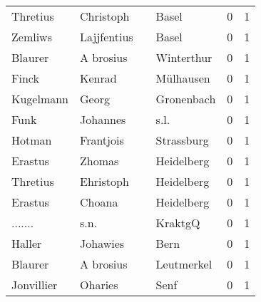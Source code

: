 \begin{center}
\begin{tiny}
\begin{longtabu}{llllrr}
                 Thretius &                          Christoph &             &                                       Basel &          0 &         1 \\
                  Zemliws &                        Lajjfentius &             &                                       Basel &          0 &         1 \\
                  Blaurer &                          A brosius &             &                                  Winterthur &          0 &         1 \\
                    Finck &                             Kenrad &             &                                   Mülhausen &          0 &         1 \\
                Kugelmann &                              Georg &             &                                  Gronenbach &          0 &         1 \\
                     Funk &                           Johannes &             &                                        s.l. &          0 &         1 \\
                   Hotman &                          Frantjois &             &                                  Strassburg &          0 &         1 \\
                  Erastus &                             Zhomas &             &                                  Heidelberg &          0 &         1 \\
                 Thretius &                          Ehristoph &             &                                  Heidelberg &          0 &         1 \\
                  Erastus &                             Choana &             &                                  Heidelberg &          0 &         1 \\
                  ....... &                               s.n. &             &                                     KraktgQ &          0 &         1 \\
                   Haller &                           Johawies &             &                                        Bern &          0 &         1 \\
                  Blaurer &                          A brosius &             &                                  Leutmerkel &          0 &         1 \\
               Jonvillier &                            Oharies &             &                                        Senf &          0 &         1 \\

\end{longtabu}
\end{tiny}
\end{center}
